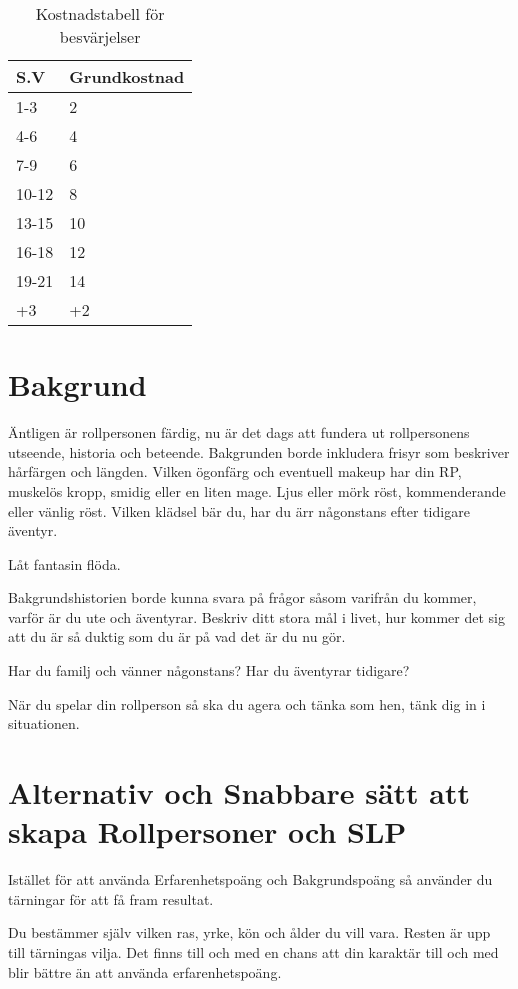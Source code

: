 \documentclass[a4paper, 10pt, titlepage]{article}
\begin{document}
\begin{table}[hbp]
  \caption{Kostnadstabell för besvärjelser}
  \begin{tabular}{|l|l|}
    \hline
    S.V  &  Grundkostnad \\
    \hline
    1-3   & 2 \\
    \hline
    4-6   & 4 \\
    \hline
    7-9   & 6 \\
    \hline
    10-12 & 8 \\
    \hline
    13-15 & 10 \\
    \hline
    16-18 & 12 \\
    \hline
    19-21 & 14 \\
    \hline
    +3    & +2 \\
    \hline
  \end{tabular}
\end{table}

\section{Bakgrund}
Äntligen är rollpersonen färdig, nu är det dags att fundera ut rollpersonens
utseende, historia och beteende. Bakgrunden borde inkludera frisyr som beskriver
hårfärgen och längden. Vilken ögonfärg och eventuell makeup har din RP, muskelös
kropp, smidig eller en liten mage. Ljus eller mörk röst, kommenderande eller vänlig röst.
Vilken klädsel bär du, har du ärr någonstans efter tidigare äventyr.

Låt fantasin flöda.

Bakgrundshistorien borde kunna svara på frågor såsom varifrån du kommer, varför är du ute
och äventyrar. Beskriv ditt stora mål i livet, hur kommer det sig att du är så duktig som du är
på vad det är du nu gör.

Har du familj och vänner någonstans? Har du äventyrar tidigare?

När du spelar din rollperson så ska du agera och tänka som hen, tänk dig in i situationen.

\section{Alternativ och Snabbare sätt att skapa Rollpersoner och SLP}
Istället för att använda Erfarenhetspoäng och Bakgrundspoäng så använder du tärningar för att
få fram resultat.

Du bestämmer själv vilken ras, yrke, kön och ålder du vill vara. Resten är upp till tärningas vilja.
Det finns till och med en chans att din karaktär till och med blir bättre än att använda erfarenhetspoäng.
\end{document}
